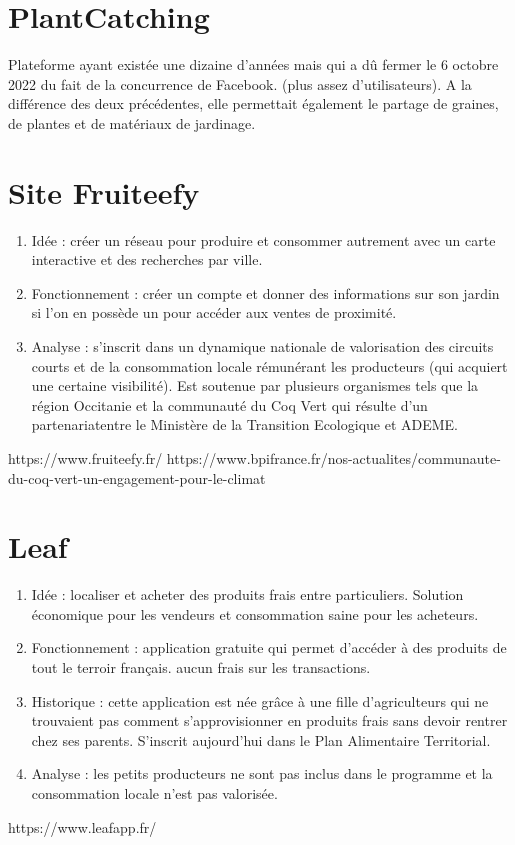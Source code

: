 \documentclass{article}
\begin{document}
\section{PlantCatching} Plateforme ayant existée une dizaine d'années mais
qui a dû fermer le 6 octobre 2022 du fait de la concurrence de Facebook.
(plus assez d'utilisateurs). A la différence des deux précédentes, elle
permettait également le partage de graines, de plantes et de matériaux de
jardinage.

\section{Site Fruiteefy}
\begin{enumerate}
    \item Idée : créer un réseau pour produire et consommer autrement
    avec un carte interactive et des recherches par ville.
    \item Fonctionnement : créer un compte et donner des informations sur
    son jardin si l'on en possède un pour accéder aux ventes de proximité. 
    \item Analyse : s'inscrit dans un dynamique nationale de valorisation
    des circuits courts et de la consommation locale rémunérant les
    producteurs (qui acquiert une certaine visibilité). Est soutenue par
    plusieurs organismes tels que la région Occitanie et la communauté du 
    Coq Vert qui résulte d'un partenariatentre le Ministère de la 
    Transition Ecologique et ADEME.
\end{enumerate}
https://www.fruiteefy.fr/
https://www.bpifrance.fr/nos-actualites/communaute-du-coq-vert-un-engagement-pour-le-climat

\section{Leaf}
\begin{enumerate}
    \item Idée : localiser et acheter des produits frais entre particuliers.
    Solution économique pour les vendeurs et consommation saine pour les
    acheteurs.
    \item Fonctionnement : application gratuite qui permet d'accéder à
    des produits de tout le terroir français. aucun frais sur les
    transactions.
    \item Historique : cette application est née grâce à une fille 
    d'agriculteurs qui ne trouvaient pas comment s'approvisionner en 
    produits frais sans devoir rentrer chez ses parents.
    S'inscrit aujourd'hui dans le Plan Alimentaire Territorial.
    \item Analyse : les petits producteurs ne sont pas inclus dans le 
    programme et la consommation locale n'est pas valorisée.
\end{enumerate}
https://www.leafapp.fr/
\end{document}
